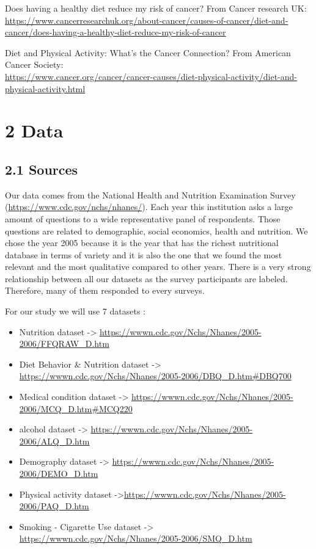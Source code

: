 \documentclass[
]{article}
\begin{document}
Does having a healthy diet reduce my risk of cancer? From Cancer
research UK:\\
\url{https://www.cancerresearchuk.org/about-cancer/causes-of-cancer/diet-and-cancer/does-having-a-healthy-diet-reduce-my-risk-of-cancer}

Diet and Physical Activity: What's the Cancer Connection? From American
Cancer Society:\\
\url{https://www.cancer.org/cancer/cancer-causes/diet-physical-activity/diet-and-physical-activity.html}

\hypertarget{data}{%
\section{\texorpdfstring{\textbf{2 Data}}{2 Data}}\label{data}}

\hypertarget{sources}{%
\subsection{2.1 Sources}\label{sources}}

Our data comes from the National Health and Nutrition Examination Survey
(\url{https://www.cdc.gov/nchs/nhanes/}). Each year this institution
asks a large amount of questions to a wide representative panel of
respondents. Those questions are related to demographic, social
economics, health and nutrition. We chose the year 2005 because it is
the year that has the richest nutritional database in terms of variety
and it is also the one that we found the most relevant and the most
qualitative compared to other years. There is a very strong relationship
between all our datasets as the survey participants are labeled.
Therefore, many of them responded to every surveys.

For our study we will use 7 datasets :

\begin{itemize}
\item
  Nutrition dataset -\textgreater{}
  \url{https://wwwn.cdc.gov/Nchs/Nhanes/2005-2006/FFQRAW_D.htm}
\item
  Diet Behavior \& Nutrition dataset -\textgreater{}
  \url{https://wwwn.cdc.gov/Nchs/Nhanes/2005-2006/DBQ_D.htm\#DBQ700}
\item
  Medical condition dataset -\textgreater{}
  \url{https://wwwn.cdc.gov/Nchs/Nhanes/2005-2006/MCQ_D.htm\#MCQ220}
\item
  alcohol dataset -\textgreater{}
  \url{https://wwwn.cdc.gov/Nchs/Nhanes/2005-2006/ALQ_D.htm}
\item
  Demography dataset -\textgreater{}
  \url{https://wwwn.cdc.gov/Nchs/Nhanes/2005-2006/DEMO_D.htm}
\item
  Physical activity dataset
  -\textgreater{}\url{https://wwwn.cdc.gov/Nchs/Nhanes/2005-2006/PAQ_D.htm}
\item
  Smoking - Cigarette Use dataset -\textgreater{}
  \url{https://wwwn.cdc.gov/Nchs/Nhanes/2005-2006/SMQ_D.htm}
\end{itemize}
\end{document}

